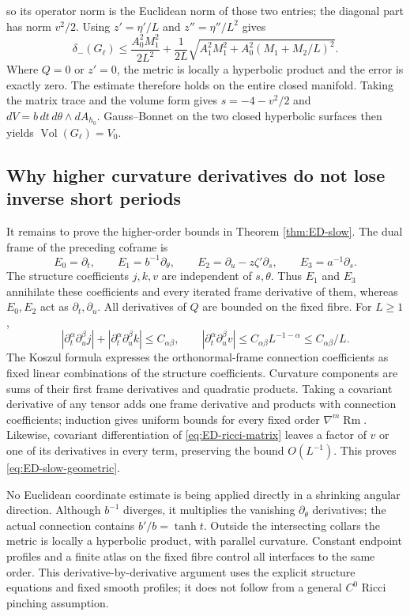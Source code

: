 \documentclass[a4paper,11pt]{article}
\numberwithin{equation}{section}
\theoremstyle{definition}
\newcommand{\Rm}{\operatorname{Rm}}
\newcommand{\Vol}{\operatorname{Vol}}
\begin{document}
so its operator norm is the Euclidean norm of those two entries; the diagonal part has norm $v^2/2$.
Using $z'=\eta'/L$ and $z''=\eta''/L^2$ gives
\begin{equation}\label{eq:ED-slow-bound}
\delta_-(G_\ell)\le
\frac{A_0^2M_1^2}{2L^2}
+\frac1{2L}\sqrt{A_1^2M_1^2+A_0^2(M_1+M_2/L)^2}.
\end{equation}
Where $Q=0$ or $z'=0$, the metric is locally a hyperbolic product and the error is exactly zero.
The estimate therefore holds on the entire closed manifold. Taking the matrix trace and the volume form gives
$s=-4-v^2/2$ and
$dV=b\,dt\,d\theta\wedge dA_{h_0}$. Gauss--Bonnet on the two closed hyperbolic surfaces
then yields $\Vol(G_\ell)=V_0$.

\subsection{Why higher curvature derivatives do not lose inverse short periods}\label{sec:ED-derivatives}
It remains to prove the higher-order bounds in Theorem \ref{thm:ED-slow}. The dual frame of the preceding coframe is
\[
E_0=\partial_t,\qquad E_1=b^{-1}\partial_\theta,\qquad
E_2=\partial_u-z\zeta'\partial_s,\qquad E_3=a^{-1}\partial_s.
\]
The structure coefficients $j,k,v$ are independent of $s,\theta$.
Thus $E_1$ and $E_3$ annihilate these coefficients and every iterated frame derivative of them,
whereas $E_0,E_2$ act as $\partial_t,\partial_u$.
All derivatives of $Q$ are bounded on the fixed fibre. For $L\ge1$,
\[
|\partial_t^\alpha\partial_u^\beta j|
+|\partial_t^\alpha\partial_u^\beta k|\le C_{\alpha\beta},
\qquad
|\partial_t^\alpha\partial_u^\beta v|
\le C_{\alpha\beta}L^{-1-\alpha}\le C_{\alpha\beta}/L.
\]
The Koszul formula expresses the orthonormal-frame connection coefficients as fixed linear combinations of the structure coefficients.
Curvature components are sums of their first frame derivatives and quadratic products.
Taking a covariant derivative of any tensor adds one frame derivative and products with connection coefficients;
induction gives uniform bounds for every fixed order $\nabla^m\Rm$.
Likewise, covariant differentiation of \eqref{eq:ED-ricci-matrix}
leaves a factor of $v$ or one of its derivatives in every term, preserving the bound $O(L^{-1})$.
This proves \eqref{eq:ED-slow-geometric}.

No Euclidean coordinate estimate is being applied directly in a shrinking angular direction.
Although $b^{-1}$ diverges, it multiplies the vanishing $\partial_\theta$ derivatives;
the actual connection contains $b'/b=\tanh t$. Outside the intersecting collars the metric is locally a hyperbolic product,
with parallel curvature. Constant endpoint profiles and a finite atlas on the fixed fibre control all interfaces to the same order.
This derivative-by-derivative argument uses the explicit structure equations and fixed smooth profiles;
it does not follow from a general $C^0$ Ricci pinching assumption.
\end{document}
